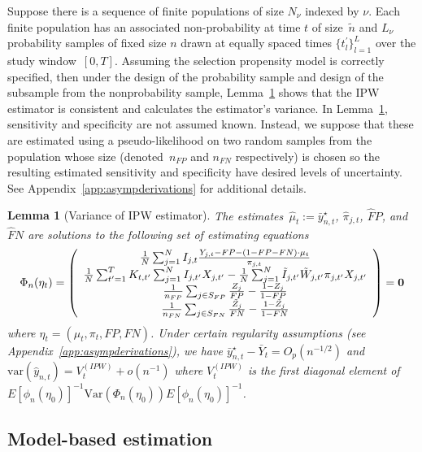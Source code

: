 \documentclass[11pt]{amsart}
\numberwithin{equation}{section}
\theoremstyle{plain}
\newtheorem{lemma}[theorem]{Lemma}
\begin{document}
Suppose there is a sequence of finite populations of size $N_{\nu}$ indexed by $\nu$.  Each finite population has an associated non-probability at time $t$ of  size~$\tilde n$ and $L_\nu$ probability samples of fixed size $n$ drawn at equally spaced times $\{ t^\prime_l \}_{l=1}^L$ over the study window~$[0,T]$. Assuming the selection propensity model is correctly specified, then under the design of the probability sample and design of the subsample from the nonprobability sample, Lemma~\ref{lemma:ipw} shows that the IPW estimator is  consistent and calculates the estimator's variance.  In Lemma~\ref{lemma:ipw}, sensitivity and specificity are not assumed known.  Instead, we suppose that these are estimated using a pseudo-likelihood on two random samples from the population whose size (denoted~$n_{FP}$ and $n_{FN}$ respectively) is chosen so the resulting estimated sensitivity and specificity have desired levels of uncertainty.  See Appendix~\ref{app:asympderivations} for additional details.

\begin{lemma}[Variance of IPW estimator] \normalfont
\label{lemma:ipw}
The estimates~$\hat \mu_t := \bar y_{n,t}^\star$, $\hat \pi_{j,t}$, $\hat FP$, and $\hat FN$ are solutions to the following set of estimating equations
$$
\Phi_n (\eta_t) =
\left (
\begin{array}{c}
\frac{1}{N} \sum_{j=1}^N I_{j,t} \frac{Y_{j,t} - FP - (1-FP-FN) \cdot \mu_t}{\pi_{j,t}} \\
\frac{1}{N} \sum_{t^\prime = 1}^T K_{t,t^\prime} \sum_{j=1}^N I_{j,t^\prime} X_{j,t^\prime} - \frac{1}{N} \sum_{j = 1}^N \tilde I_{j,t^\prime} \tilde W_{j,t^\prime}  \pi_{j,t^\prime} X_{j,t^\prime}  \\
\frac{1}{n_{FP}} \sum_{j \in S_{FP}} \frac{Z_j}{FP} - \frac{1-Z_j}{1-FP} \\
\frac{1}{n_{FN}} \sum_{j \in S_{FN}} \frac{\tilde Z_j}{FN} - \frac{1-\tilde Z_j}{1-FN} \\
\end{array}
\right ) = {\bf 0}
$$
where $\eta_t = (\mu_t, \pi_t, FP, FN)$. Under certain regularity assumptions (see Appendix~\ref{app:asympderivations}), we have $\bar y_{n,t}^\star - \bar Y_{t} = O_p (n^{-1/2})$  and $\text{var} (\hat y_{n,t}) = V_{t}^{(IPW)} + o (n^{-1})$ where $V_t^{(IPW)}$ is the first diagonal element of $E [\phi_n(\eta_0)]^{-1} \text{Var}(\Phi_n(\eta_0))E [\phi_n(\eta_0)]^{-1}$.
\end{lemma}

\subsection{Model-based estimation}
\label{section:modelbased}
\end{document}
